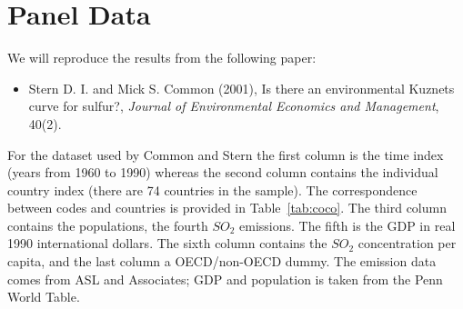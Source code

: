 \documentclass[landscape,letterpaper,9pt]{article}
\begin{document}
%
%


\newpage
\section{Panel Data}
We will reproduce the results from the following paper:
\begin{itemize}
\item Stern D. I. and Mick S. Common (2001), Is there an environmental Kuznets curve for sulfur?,
 \emph{Journal of Environmental Economics and Management}, 40(2).
\end{itemize}

For the dataset used by Common and Stern the first column is the time
index (years from 1960 to 1990) whereas the second column contains  the individual country index (there
are 74 countries in the sample).
The correspondence between codes and countries is provided in Table~\ref{tab:coco}.
The third column contains the populations, the fourth \(SO_2\) emissions. The fifth is the GDP in
real 1990 international dollars. The sixth column contains the \(SO_2\) concentration per capita, and
the last column a OECD/non-OECD dummy. The emission data comes from ASL and Associates; GDP and population
is taken from the Penn World Table.
\end{document}

